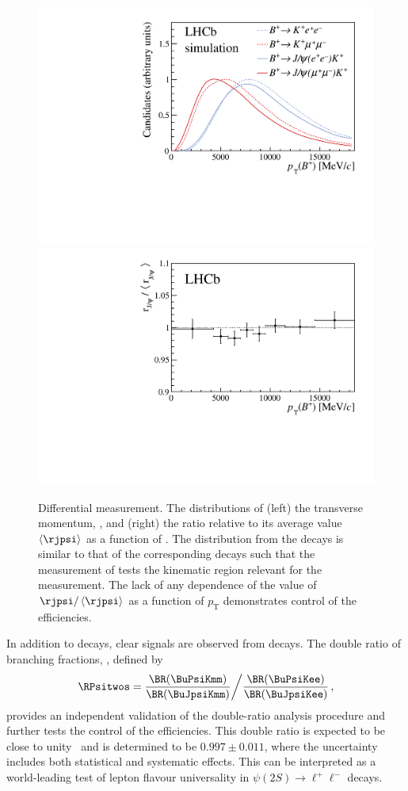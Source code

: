 \begin{figure}[!b]
   \begin{center}

\includegraphics[width=0.45\linewidth,trim={0 0 0 0.5cm}, clip]{figures/Fig3a.pdf}
\includegraphics[width=0.45\linewidth,trim={0 0.15cm 0 0}, clip]{figures/Fig3b.pdf}
      \end{center}
      \caption{Differential \rjpsi measurement. The 
      distributions of (left) the \Bp transverse momentum, \pt, and (right) the ratio \rjpsi relative to its average value $\left< \rjpsi \right>$ as a function of \pt. The distribution from the \BuJpsiK decays is similar to that of the corresponding \BuKll decays such that the measurement of \rjpsi tests the kinematic region relevant for the \RK measurement. The lack of any dependence of the value of $\rjpsi/\left< \rjpsi \right>$ as a function of \Bp $p_{\mathrm T}$ demonstrates control of the efficiencies.}
    \label{fig:rjpsi_differential}
\end{figure}

In addition to \BuJpsiK decays, 
clear signals are observed from \BuPsiK decays. 
The double ratio of branching fractions, \RPsitwos, defined by
\begin{equation}
\label{eq:RPsitwos}
\RPsitwos  =
{\frac{\BR(\BuPsiKmm)}{\BR(\BuJpsiKmm)}} \bigg{/} {\frac{\BR(\BuPsiKee)}{\BR(\BuJpsiKee)}}  \,,
\end{equation}
\noindent provides an independent validation of the double-ratio analysis procedure and further tests the control of the efficiencies. 
This double ratio is expected to be close to unity~\cite{PDG2020}
and is determined to be $0.997\pm 0.011$, where the uncertainty includes both statistical and systematic effects.
This can be interpreted as a world-leading test of lepton flavour universality in $\psi(2S) \rightarrow \ell^+\ell^-$ decays.

